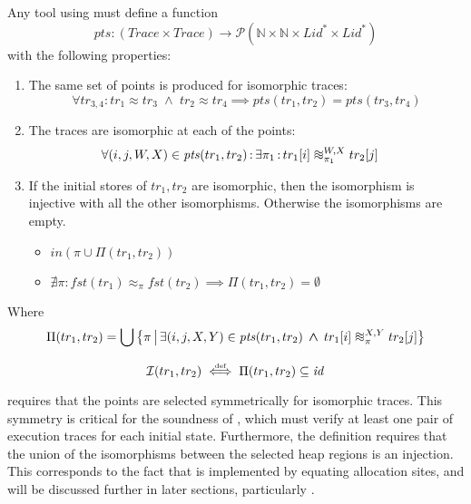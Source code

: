 \documentclass[runningheads,a4paper]{llncs}
\DeclareMathOperator{\band}{\bm{\;\land\;}}
\DeclareMathOperator{\suchthat}{:}
\newcommand*{\qvars}[2]{#1_{#2}}
\newcommand*{\powerset}[1]{\mathcal{P}(#1)}
\newcommand*{\identity}[0]{\mathit{id}}
\newcommand*{\defiff}{\stackrel{\text{\tiny def}}{\iff}}
\newcommand*{\setcomp}[2]{\left\{#1\,\middle|\,#2\right\}}
\newcommand*{\nat}{\mathbb{N}}
\newcommand*{\first}[1]{\mathit{fst}(#1)}
\newcommand*{\Trace}{\mathit{Trace}}
\newcommand{\tr}{tr}
\newcommand*\iso{\approx}
\newcommand*{\LVar}{\mathit{Lid}}
\newcommand*{\bijection}[1]{\mathit{in}{\left(#1\right)}}
\newcommand*{\wiso}{%
  \mathrel{\vcenter{\offinterlineskip
  \hbox{$\sim$}\vskip-.35ex\hbox{$\sim$}\vskip-.35ex\hbox{$\sim$}}}}
\newcommand*{\myIsoCompatibleStates}{\mathit{pts}}
\newcommand*{\isoR}{\mathcal{I}}
\begin{document}
\begin{definition}\label{def:isomorphic points}\setlength{\parindent}{0cm}
	
	Any tool using \metho{} must define a function
	\[\myIsoCompatibleStates : (\Trace\times\Trace) \rightarrow \powerset{\nat \times \nat \times \LVar^* \times \LVar^*}\]
	with the following properties:
	\begin{enumerate}
		\item The same set of points is produced for isomorphic traces:
		\[
			\forall \qvars{\tr}{3,4} \suchthat \tr_1\iso\tr_3 \band \tr_2\iso\tr_4
			\implies \myIsoCompatibleStates(\tr_1,\tr_2) = \myIsoCompatibleStates(\tr_3,\tr_4)
		\]
		\item The traces are isomorphic at each of the points:
		\[\begin{aligned}
			&\forall (i,j,W,X)\in \myIsoCompatibleStates(\tr_1,\tr_2) \suchthat \exists \pi_1 \suchthat \tr_1[i] \wiso_{\pi_1}^{W,X} \tr_2[j]
		\end{aligned}\]
		\item If the initial stores of $\tr_1,\tr_2$ are isomorphic, then the isomorphism is injective with all the other isomorphisms. Otherwise the isomorphisms are empty.
		\begin{itemize}
			\item $\bijection{\pi \cup \Pi(\tr_1,\tr_2)}$
			\item $\nexists \pi \suchthat \first{\tr_1} \iso_{\pi} \first{\tr_2} \implies \Pi(\tr_1,\tr_2) = \emptyset$
		\end{itemize}
	\end{enumerate}
	Where
	\[\begin{aligned}
		\Pi(\tr_1,\tr_2) = \bigcup\setcomp{\pi}{\exists (i,j,X,Y) \in \myIsoCompatibleStates(\tr_1,\tr_2) \band \tr_1[i] \wiso_{\pi}^{X,Y} \tr_2[j]}
	\end{aligned}\]
\end{definition}

\begin{definition}\label{def:my compatible isomorphic states}\setlength{\parindent}{0cm}
\[\isoR(\tr_1,\tr_2) \defiff \Pi(\tr_1,\tr_2) \subseteq \identity\]
\end{definition}

 requires that the points are selected symmetrically for isomorphic traces. This symmetry is critical for the soundness of \metho{}, which must verify at least one pair of execution traces for each initial state. Furthermore, the definition requires that the union of the isomorphisms between the selected heap regions is an injection. This corresponds to the fact that \metho{} is implemented by equating allocation sites, and will be discussed further in later sections, particularly .
\end{document}
